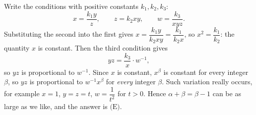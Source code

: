 Write the conditions with positive constants $k_1,k_2,k_3$:
\[
x=\dfrac{k_1y}{z},\qquad z=k_2xy,\qquad w=\dfrac{k_3}{xyz}.
\]
Substituting the second into the first gives $x=\dfrac{k_1y}{k_2xy}=\dfrac{k_1}{k_2x}$, so $x^2=\dfrac{k_1}{k_2}$: the quantity $x$ is constant. Then the third condition gives
\[
yz=\dfrac{k_3}{x}\cdot w^{-1},
\]
so $yz$ is proportional to $w^{-1}$. Since $x$ is constant, $x^{\beta}$ is constant for every integer $\beta$, so $yz$ is proportional to $w^{-1}x^{\beta}$ for \emph{every} integer $\beta$. Such variation really occurs, for example $x=1$, $y=z=t$, $w=\dfrac{1}{t^2}$ for $t>0$. Hence $\alpha+\beta=\beta-1$ can be as large as we like, and the answer is $\boxed{\text{(E)}}$.
